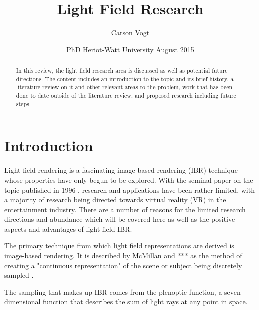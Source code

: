 \documentclass[12pt]{report}
\begin{document}
\title{Light Field Research \vspace{2.5cm}}	%
\author{
\Large Carson Vogt \vspace{1cm} \\ 
}

\date{
	\centering
	PhD \endgraf\medskip
	Heriot-Watt University \endgraf{} August 2015
}

\maketitle

\begin{abstract}
\begin{small}
In this review, the light field research area is discussed as well as potential future directions. The content includes an introduction to the topic and its brief history, a literature review on it and other relevant areas to the problem, work that has been done to date outside of the literature review, and proposed research including future steps.
\end{small}
\end{abstract}

\listoffigures

\tableofcontents

\chapter*{Introduction}
Light field rendering is a fascinating image-based rendering (IBR) technique whose properties have only begun to be explored. With the seminal paper on the topic published in 1996 \cite{Levoy96}, research and applications have been rather limited, with a majority of research being directed towards virtual reality (VR) in the entertainment industry. There are a number of reasons for the limited research directions and abundance which will be covered here as well as the positive aspects and advantages of light field IBR.

The primary technique from which light field representations are derived is image-based rendering. It is described by McMillan and *** as the method of creating a "continuous representation" of the scene or subject being discretely sampled \cite{McMillan95}. 

The sampling that makes up IBR comes from the plenoptic function, a seven-dimensional function that describes the sum of light rays at any point in space.
\end{document}
